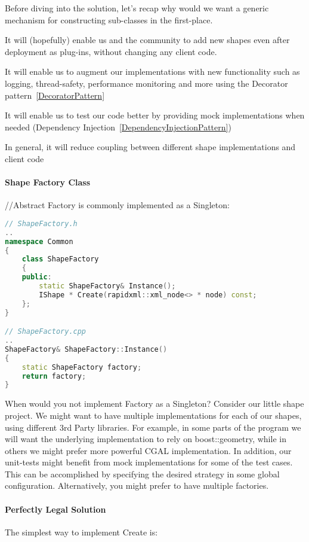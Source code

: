 \documentclass{book}
\begin{document}
Before diving into the solution, let’s recap why would we want a generic mechanism for constructing sub-classes in the first-place.

    It will (hopefully) enable us and the community to add new shapes even after deployment as plug-ins, without changing any client code.

    It will enable us to augment our implementations with new functionality such as logging, thread-safety, performance monitoring and more using the Decorator pattern~\ref{DecoratorPattern}

    It will enable us to test our code better by providing mock implementations when needed (Dependency Injection~\ref{DependencyInjectionPattern})

    In general, it will reduce coupling between different shape implementations and client code


\paragraph{Shape Factory Class}
//Abstract Factory is commonly implemented as a Singleton:

\begin{lstlisting}[caption={Abstract Factory Pattern sample 2-1}, language=C++]
// ShapeFactory.h
..
namespace Common
{
    class ShapeFactory
    {
    public:
        static ShapeFactory& Instance();
        IShape * Create(rapidxml::xml_node<> * node) const;
    };
}

// ShapeFactory.cpp
..
ShapeFactory& ShapeFactory::Instance()
{
    static ShapeFactory factory;
    return factory;
}
\end{lstlisting}
When would you not implement Factory as a Singleton?
Consider our little shape project. We might want to have multiple implementations for each of our shapes, using different 3rd Party libraries.
For example, in some parts of the program we will want the underlying implementation to rely on boost::geometry, while in others we might prefer more powerful CGAL implementation.
In addition, our unit-tests might benefit from mock implementations for some of the test cases.
This can be accomplished by specifying the desired strategy in some global configuration. Alternatively, you might prefer to have multiple factories.

\paragraph{Perfectly Legal Solution}
The simplest way to implement Create is:
\end{document}
